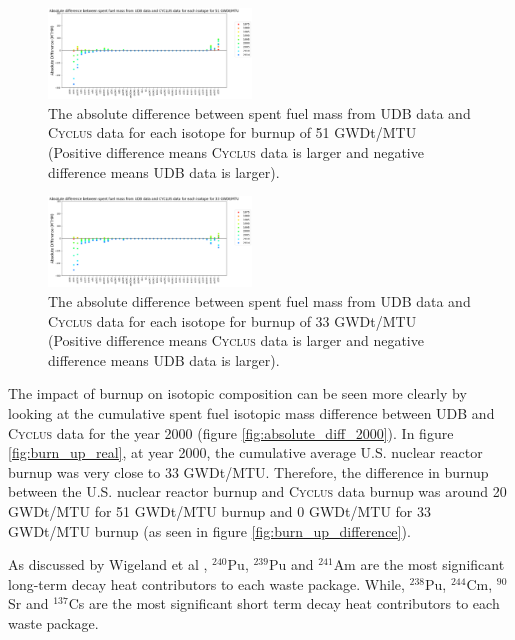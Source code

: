 \documentclass{anstrans}
\newcommand{\Cyclus}{\textsc{Cyclus}\xspace}%
\begin{document}
\begin{figure}[t] %
	\centering
	\includegraphics[width=0.48\textwidth]{figures/absolute_diff_all_51}
	\caption{The absolute difference between spent fuel mass from UDB data and \Cyclus data for each isotope for burnup of 51 GWDt/MTU (Positive difference means \Cyclus data is larger and negative difference means UDB data is larger).}
	\label{fig:absolute_diff_all_51}
\end{figure} 

\begin{figure}[t] %
	\centering
	\includegraphics[width=0.48\textwidth]{figures/absolute_diff_all_33}
	\caption{The absolute difference between spent fuel mass from UDB data and \Cyclus data for each isotope for burnup of 33 GWDt/MTU (Positive difference means \Cyclus data is larger and negative difference means UDB data is larger).}
	\label{fig:absolute_diff_all_33}
\end{figure} 

The impact of burnup on isotopic composition can be seen more clearly by looking at the cumulative spent fuel isotopic mass difference between UDB and \Cyclus data for the year 2000 (figure \ref{fig:absolute_diff_2000}). In figure \ref{fig:burn_up_real}, at year 2000, the cumulative average U.S. nuclear reactor burnup was very close to 33 GWDt/MTU. Therefore, the difference in burnup between the U.S. nuclear reactor burnup and \Cyclus data burnup was around 20 GWDt/MTU for 51 GWDt/MTU burnup and 0 GWDt/MTU for 33 GWDt/MTU burnup (as seen in figure \ref{fig:burn_up_difference}). 

As discussed by Wigeland et al \cite{wigeland_separations_2006}, $^{240}$Pu, $^{239}$Pu and $^{241}$Am are the most significant long-term decay heat contributors to each waste package. While, $^{238}$Pu, $^{244}$Cm, $^{90}$Sr and $^{137}$Cs are the most significant short term decay heat contributors \cite{wigeland_separations_2006} to each waste package. 
\end{document}
